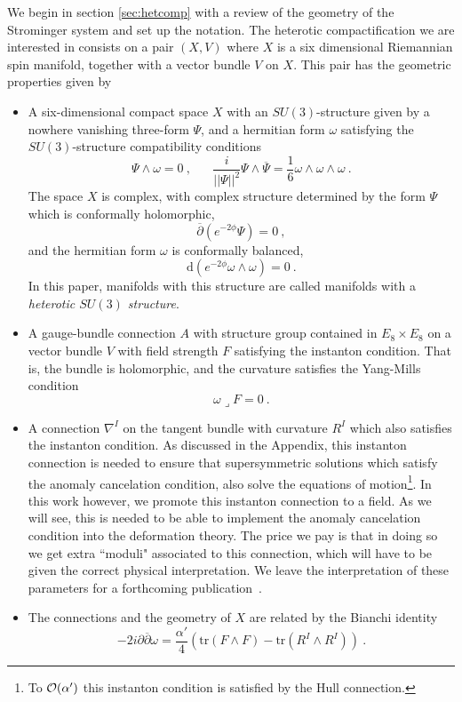 \documentclass[12pt,a4paper]{article}
\def\bar#1{\overline{#1}}
\let\p=\partial
\def\a{\alpha'}
\def\d{\textrm{d}}
\def\bp{\bar{\partial}}
\def\tr{\textrm{tr}}
\theoremstyle{definition}
\begin{document}
We begin in section \ref{sec:hetcomp} with a review of  the geometry of the Strominger system and set up the notation. 
The heterotic compactification we are interested in consists on a pair $(X,V)$ where $X$ is a six dimensional Riemannian spin manifold, together with a vector bundle $V$ on $X$.  This pair has the geometric properties  given by
\begin{itemize}
\item A six-dimensional compact space $X$ with an $SU(3)$-structure given by a nowhere vanishing three-form $\Psi$, and a hermitian form $\omega$ satisfying the $SU(3)$-structure compatibility conditions
\begin{equation*}
\Psi\wedge\omega=0\:,\;\;\;\;\;\;\frac{i}{\vert\vert\Psi\vert\vert^2}\Psi\wedge\bar\Psi=\frac{1}{6}\omega\wedge\omega\wedge\omega\:.
\end{equation*}
The space $X$ is complex, with complex structure determined by the form $\Psi$  which is conformally holomorphic,
\begin{equation*}
\bp(e^{-2\phi}\Psi)=0\:,
\end{equation*}
and the hermitian form $\omega$ is conformally balanced,
\begin{equation*}
\d(e^{-2\phi}\omega\wedge\omega)=0\:.
\end{equation*}
In this paper, manifolds with this structure are called manifolds with a {\it heterotic $SU(3)$ structure}. 
\item A gauge-bundle connection $A$ with structure group contained in $E_8{\times}E_8$ on a vector bundle $V$ with field strength $F$ satisfying the instanton condition. That is,  the bundle is holomorphic, and the curvature satisfies the Yang-Mills condition
\begin{equation*}
\omega\lrcorner F=0\:.
\end{equation*}
\item A  connection $\nabla^I$ on the tangent bundle with curvature $R^I$ which also satisfies the instanton condition. As discussed in the Appendix, this instanton connection is needed to ensure that supersymmetric solutions which satisfy the anomaly cancelation condition, also solve the equations of motion\footnote{To $\cal{O}(\alpha')$ this instanton condition is satisfied by the Hull connection.}.  In this work however, we promote this instanton connection to a field.  As we will see, this is needed to be able to implement the anomaly cancelation condition into the deformation theory.  The price we pay is that in doing so we get extra ``moduli" associated to this connection, which will have to be given the correct physical interpretation.  We leave the interpretation of these parameters for a forthcoming publication~\cite{delaossa2014}.
\item The connections and the geometry of $X$ are related by the Bianchi identity
\begin{equation*}
-2i\p\bp\omega=\frac{\a}{4}(\tr (F\wedge F)-\tr (R^I\wedge R^I))\:.
\end{equation*}
\end{itemize}
\end{document}
